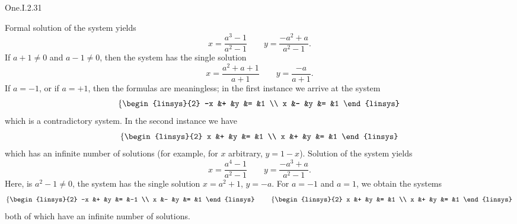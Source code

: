 \begin{ans}{One.I.2.31}
       \answerasgiven
       \begin{exparts}
        \partsitem Formal solution of the system yields
          \begin{equation*}
            x=\frac{a^3-1}{a^2-1}
            \qquad
            y=\frac{-a^2+a}{a^2-1}.
          \end{equation*}
          If $a+1\neq 0$ and $a-1\neq 0$, then the system has the single
          solution
          \begin{equation*}
            x=\frac{a^2+a+1}{a+1}
            \qquad
            y=\frac{-a}{a+1}.
          \end{equation*}
          If $a=-1$, or if $a=+1$, then the formulas are meaningless; in the
          first instance we arrive at the system
          \begin{equation*}
            \left\{
            \begin{linsys}{2}
              -x &+  &y  &=  &1 \\
               x &-  &y  &=  &1
            \end{linsys}\right.
          \end{equation*}
          which is a contradictory system.
          In the second instance we have
          \begin{equation*}
            \left\{
            \begin{linsys}{2}
               x &+  &y  &=  &1 \\
               x &+  &y  &=  &1
            \end{linsys}\right.
          \end{equation*}
          which has an infinite number of solutions (for example, for
          $x$ arbitrary, $y=1-x$).
        \partsitem Solution of the system yields
          \begin{equation*}
            x=\frac{a^4-1}{a^2-1}
            \qquad
            y=\frac{-a^3+a}{a^2-1}.
          \end{equation*}
          Here, is $a^2-1\neq 0$, the system has the single solution
          $x=a^2+1$, $y=-a$.
          For $a=-1$ and $a=1$, we obtain the systems
          \begin{equation*}
            \left\{
            \begin{linsys}{2}
              -x &+  &y  &=  &-1 \\
               x &-  &y  &=  &1
            \end{linsys}\right.
            \qquad
            \left\{
            \begin{linsys}{2}
               x &+  &y  &=  &1 \\
               x &+  &y  &=  &1
            \end{linsys}\right.
         \end{equation*}
         both of which have an infinite number of solutions.
      \end{exparts}
    
\end{ans}
